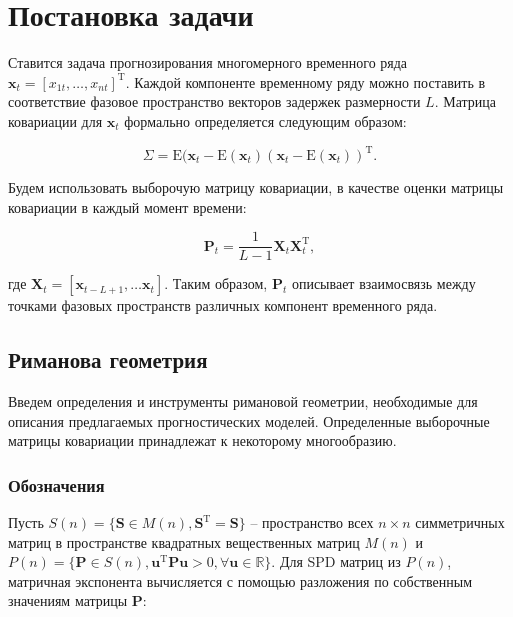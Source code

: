 \documentclass{article}
\begin{document}
\section{Постановка задачи}

Ставится задача прогнозирования многомерного временного ряда $\mathbf{x}_t = [x_{1t}, \ldots, x_{nt}]^{\text{T}}$. Каждой компоненте временному ряду можно поставить в соответствие фазовое пространство векторов задержек размерности $L$. Матрица ковариации для $\mathbf{x}_t$ формально определяется следующим образом:

\begin{equation}
    \Sigma = \text{E} (\mathbf{x}_t - \text{E}(\mathbf{x}_t)(\mathbf{x}_t - \text{E}(\mathbf{x}_t))^{\text{T}}.
\end{equation}

Будем использовать выборочую матрицу ковариации, в качестве оценки матрицы ковариации в каждый момент времени:

\begin{equation}
    \mathbf{P}_t = \dfrac{1}{L - 1}\mathbf{X}_t\mathbf{X}_t^{\text{T}},
\end{equation}

где $\mathbf{X}_t = [\mathbf{x}_{t - L + 1}, \ldots \mathbf{x}_{t}]$. Таким образом, $\mathbf{P}_t$ описывает взаимосвязь между точками фазовых пространств различных компонент временного ряда.

\subsection{Риманова геометрия}

Введем определения и инструменты римановой геометрии, необходимые для описания предлагаемых прогностических моделей. Определенные выборочные матрицы ковариации принадлежат к некоторому многообразию. 

\subsubsection{Обозначения}

Пусть $S(n) = \{\mathbf{S} \in M(n), \mathbf{S}^{\text{T}} = \mathbf{S}\}$ -- пространство всех $n \times n$ симметричных матриц в пространстве квадратных вещественных матриц $M(n)$ и $P(n) = \{\mathbf{P} \in S(n), \mathbf{u}^{\text{T}}\mathbf{P}\mathbf{u} > 0, \forall \mathbf{u} \in \mathds{R}\}$. Для SPD матриц из $P(n)$, матричная экспонента вычисляется с помощью  разложения по собственным значениям матрицы $\mathbf{P}$:
\end{document}
